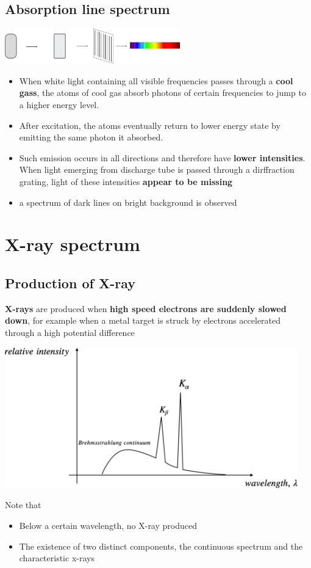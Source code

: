\documentclass[a4paper, 10pt]{article}
\begin{document}
\subsection{Absorption line spectrum}
\begin{center}
   \includegraphics[width=3in]{figures/9.pdf} 
\end{center}	

\begin{itemize}
   \item When white light containing all visible frequencies passes through a \textbf{cool gass}, the atoms of cool gas absorb photons of certain frequencies to jump to a higher energy level. 
   \item After excitation, the atoms eventually return to lower energy state by emitting the same photon it absorbed. 
   \item Such emission occurs in all directions and therefore have \textbf{lower intensities}. When light emerging from discharge tube is passed through a dirffraction grating, light of these intensities \textbf{appear to be missing}
   \item a spectrum of dark lines on bright background is observed
\end{itemize}	

\section{X-ray spectrum}
\subsection{Production of X-ray}
\begin{framed}
   \textbf{X-rays} are produced when \textbf{high speed electrons are suddenly slowed down}, for example when a metal target is struck by electrons accelerated through a high potential difference
   \begin{center}
      \includegraphics[width=5in]{figures/10.pdf} 
   \end{center}	
\end{framed}	
Note that 
\begin{itemize}
   \item Below a certain wavelength, no X-ray produced
   \item The existence of two distinct components, the continuous spectrum and the characteristic x-rays
\end{itemize}	
\end{document}
